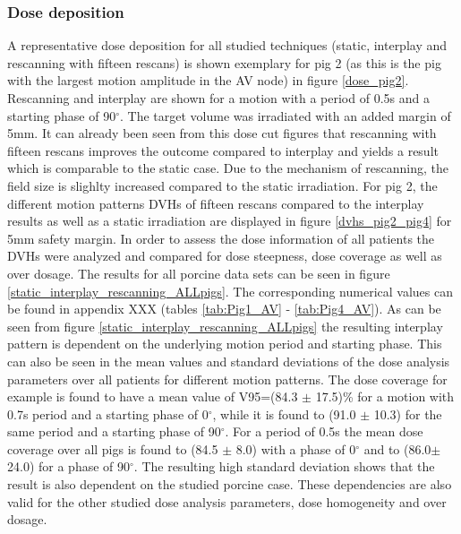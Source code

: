 \documentclass[type=dr, dr=rernat, accentcolor=tud7b,colorbacktitle, bigchapter, openright, twoside, 12pt ]{tudthesis}
\begin{document}
\subsubsection{Dose deposition }
A representative dose deposition for all studied techniques (static, interplay and rescanning with fifteen rescans) is shown exemplary for pig  
2 (as this is the pig with the largest motion amplitude in the AV node) in figure \ref{dose_pig2}. Rescanning and interplay are 
shown for a motion with a period of 0.5s and a starting phase of 90$^{\circ}$. The target volume was irradiated 
with an added margin of 5mm. It can already been seen from this dose cut figures that rescanning with fifteen rescans improves the outcome 
compared to interplay and yields a result which is comparable to the static case. Due to the mechanism of rescanning, the field size is 
slighlty increased compared to the static irradiation.\newline
\newline
For pig 2, the different motion patterns DVHs of fifteen rescans compared to the interplay results as well as a static irradiation are 
displayed in figure \ref{dvhs_pig2_pig4} for 5mm safety margin. In order to assess the dose information of all patients the DVHs were analyzed and 
compared for dose steepness, dose coverage as well as over dosage. The results for all porcine data sets can be seen in figure 
\ref{static_interplay_rescanning_ALLpigs}. The corresponding numerical values can be found in appendix XXX (tables \ref{tab:Pig1_AV} - 
\ref{tab:Pig4_AV}).\newline
\newline
As can be seen from figure \ref{static_interplay_rescanning_ALLpigs} the resulting interplay pattern is dependent on the underlying motion 
period and starting phase. This can also be seen in the mean values and standard deviations of the dose analysis parameters over all patients 
for different motion patterns. The dose coverage for example is found to have a mean value of V95=(84.3 $\pm$ 17.5)\% for a motion with 0.7s 
period and a starting phase of 0$^{\circ}$, while it is found to (91.0 $\pm$ 10.3) for the same period and a starting phase of 90$^{\circ}$. 
For a period of 0.5s the mean dose coverage over all pigs is found to (84.5 $\pm$ 8.0) with a phase of 0$^{\circ}$ and to (86.0$\pm$ 24.0) 
for a phase of 90$^{\circ}$. The resulting high standard deviation shows that the result is also dependent on the studied porcine case.
These dependencies are also valid for the other studied dose analysis parameters, dose homogeneity and over dosage.\newline
\end{document}
